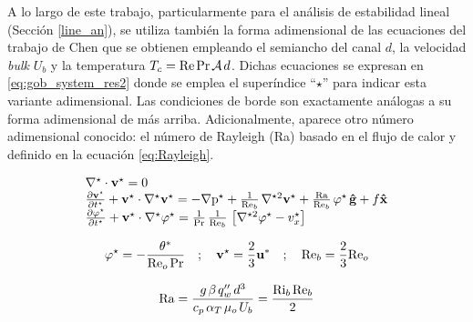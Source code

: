 A lo largo de este trabajo, particularmente para el análisis de estabilidad lineal (Sección \ref{line_an}), se utiliza también la forma adimensional de las ecuaciones del trabajo de Chen \cite{chen1996linear} que se obtienen empleando el  semiancho del canal $d$, la velocidad \textit{bulk} $U_b$ y la temperatura $T_c = \text{Re} \hspace{0.5mm} \text{Pr} \hspace{0.5mm} \mathcal{A} \hspace{0.5mm} d$. Dichas ecuaciones se expresan en \ref{eq:gob_system_res2} donde se emplea el superíndice ``${\star}$'' para indicar esta variante adimensional. Las condiciones de borde son exactamente análogas a su forma adimensional de más arriba. Adicionalmente, aparece otro número adimensional conocido: el número de Rayleigh (Ra) basado en el flujo de calor y definido en la ecuación \ref{eq:Rayleigh}.

\begin{equation}
\begin{array}{l}
    \nabla^{\star} \cdot \mathbf{v^{\star}} = 0 \\
    \frac{\partial \mathbf{v^{\star}}}{\partial t^{\star}} + \mathbf{v^{\star}} \cdot \nabla^{\star} \mathbf{v^{\star}} = 
    -\nabla \text{p}^{\star} + \frac{1}{\text{Re}_b} \hspace{0.5mm} \nabla^{{\star}2} \mathbf{v^{\star}} + \frac{\text{Ra}}{\text{Re}_b} \hspace{0.5mm} \varphi^{\star} \hspace{0.5mm} \mathbf{\hat{g}} + f \mathbf{\hat{x}} \\
    \frac{\partial \varphi^{\star}}{\partial t^{\star}} + \mathbf{v^{\star}} \cdot \nabla^{\star} \varphi^{\star} = 
    \frac{1}{\text{Pr}}\hspace{0.5mm}  \frac{1}{\text{Re}_b} \hspace{0.5mm} \left[ \nabla^{{\star}2} \varphi^{\star} - v_x^{\star} \right]  
\end{array}
\label{eq:gob_system_res2}
\end{equation}

\begin{equation*}
\varphi^{\star} = -  \frac{\theta^*}{\text{Re}_o \hspace{0.5mm} \text{Pr}}  \quad ; \quad \mathbf{v^{\star}} = \frac{2}{3} \mathbf{u^*} \quad ; \quad \text{Re}_b = \frac{2}{3} \text{Re}_o
\end{equation*}  

\begin{equation}
\text{Ra} = \frac{g \hspace{0.5mm} \beta \hspace{0.5mm} q''_w \hspace{0.5mm} d^3}{c_p \hspace{0.5mm} \alpha_{T} \hspace{0.5mm} \mu_o \hspace{0.5mm} U_b} = \frac{\text{Ri}_b \hspace{0.5mm} \text{Re}_b}{2} 
\label{eq:Rayleigh}
\end{equation} 


